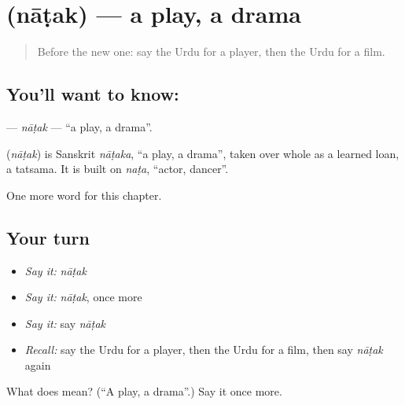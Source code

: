 \section[\texorpdfstring{\ur{ناٹک} (nāṭak)}{ناٹک (nāṭak)}]{ (nāṭak) — a play, a drama}

\label{lesson:UR-C228-natak}



\begin{quote}
Before the new one: say the Urdu for a player, then the Urdu for a film.
\end{quote}

\subsection*{You'll want to know: }
\textbf{} — \emph{nāṭak} — \textquotedblleft{}a play, a drama\textquotedblright{}.

\begin{cousinweb}
\textbf{} (\emph{nāṭak}) is Sanskrit \emph{nāṭaka}, \textquotedblleft{}a play, a drama\textquotedblright{}, taken over whole as a learned loan, a tatsama. It is built on \emph{naṭa}, \textquotedblleft{}actor, dancer\textquotedblright{}.
\end{cousinweb}

\begin{grammarlens}[title={What you've built}]
One more word for this chapter.
\end{grammarlens}

\subsection*{Your turn}
\begin{itemize}
\raggedright
  \item \emph{Say it:} \emph{nāṭak}
  \item \emph{Say it:} \emph{nāṭak}, once more
  \item \emph{Say it:} say \emph{nāṭak}
  \item \emph{Recall:} say the Urdu for a player, then the Urdu for a film, then say \emph{nāṭak} again
\end{itemize}

\begin{tcolorbox}[breakable,colback=teal!4,colframe=teal!35!black,title={Before you move on}]
What does  mean? (\textquotedblleft{}A play, a drama\textquotedblright{}.) Say it once more.
\end{tcolorbox}
